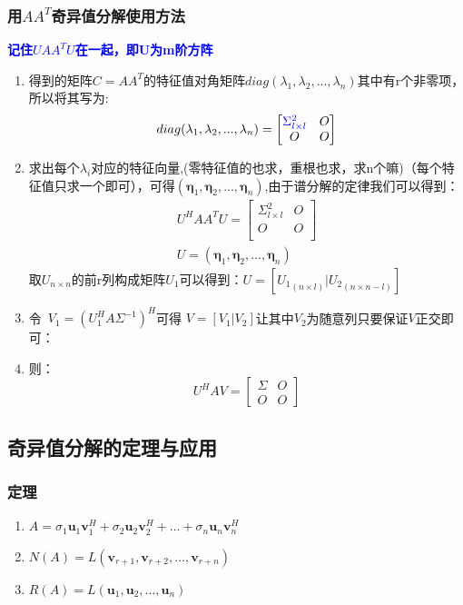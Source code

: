 \documentclass[12pt]{article}
\begin{document}
\begin{CJK*}{UTF8}{gbsn}
\subsubsection{用$AA^T$奇异值分解使用方法}
\textbf{\textcolor{blue}{记住$UAA^TU$在一起，即U为m阶方阵}}
\begin{enumerate}
	\item 得到的矩阵$C=AA^T$的特征值对角矩阵$diag(\lambda_1,\lambda_2,...,\lambda_n)$其中有r个非零项，所以将其写为:
	\begin{equation}
		diag(\lambda_1,\lambda_2,...,\lambda_n)=\begin{bmatrix}
	\textcolor{blue}{\Sigma^2_{l\times l}} &O  \\
	O&  O\\
\end{bmatrix}
	\end{equation}
	\item 求出每个$\lambda_i$对应的特征向量,(零特征值的也求，重根也求，求n个嘛)（每个特征值只求一个即可），可得$(\bm\eta_1,\bm\eta_2,...,\bm\eta_n)$,由于谱分解的定律我们可以得到：
	\begin{eqnarray*}
		U^HAA^TU=\begin{bmatrix}
	\Sigma^2_{l\times l} &O  \\
	O&  O\\
\end{bmatrix}\\
U=(\bm\eta_1,\bm\eta_2,...,\bm\eta_n)
	\end{eqnarray*}
	取$U_{n\times n}$的前r列构成矩阵$U_1$可以得到：$U=[{U_1}_{(n\times l)}|{U_2}_{(n\times n-l)}]$\\
	\item 令~$V_1=(U_1^HA\Sigma^{-1})^H$可得
	$V=[V_1|V_2]$让其中$V_2$为随意列只要保证$V$正交即可：
	\item 则：
	\begin{equation}
		U^HAV=\begin{bmatrix}
	\Sigma &O  \\
	O&  O
\end{bmatrix}
	\end{equation}
\end{enumerate}
\subsection{奇异值分解的定理与应用}
\subsubsection{定理}
\begin{enumerate}
	\item $A=\sigma_1\bm u_1\bm v_1^H+\sigma_2\bm u_2\bm v_2^H+...+\sigma_n\bm u_n\bm v_n^H$
	\item $N(A)=L(\bm v_{r+1},\bm v_{r+2},...,\bm v_{r+n})$
	\item $R(A)=L(\bm u_1,\bm u_2,...,\bm u_n)$
\end{enumerate}

\end{CJK*}
\end{document}
